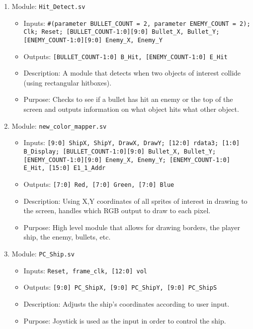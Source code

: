 \begin{enumerate}
    \item Module: \texttt{Hit\_Detect.sv}
    \begin{itemize}
        \item Inputs: \texttt{\#(parameter BULLET\_COUNT = 2, parameter ENEMY\_COUNT = 2); Clk; Reset; [BULLET\_COUNT-1:0][9:0] Bullet\_X, Bullet\_Y; [ENEMY\_COUNT-1:0][9:0] Enemy\_X, Enemy\_Y} 
        \item Outputs: \texttt{[BULLET\_COUNT-1:0] B\_Hit, [ENEMY\_COUNT-1:0] E\_Hit}
        \item Description: A module that detects when two objects of interest collide (using rectangular hitboxes).
        \item Purpose: Checks to see if a bullet has hit an enemy or the top of the screen and outputs information on what object hits what other object.
    \end{itemize}
    
    \item Module: \texttt{new\_color\_mapper.sv}
    \begin{itemize}
        \item Inputs: \texttt{[9:0] ShipX, ShipY, DrawX, DrawY; [12:0] rdata3; [1:0] B\_Display; [BULLET\_COUNT-1:0][9:0] Bullet\_X, Bullet\_Y; [ENEMY\_COUNT-1:0][9:0] Enemy\_X, Enemy\_Y; [ENEMY\_COUNT-1:0] E\_Hit, [15:0] E1\_1\_Addr} 
        \item Outputs: \texttt{[7:0] Red, [7:0] Green, [7:0] Blue}
        \item Description: Using X,Y coordinates of all sprites of interest in drawing to the screen, handles which RGB output to draw to each pixel.
        \item Purpose: High level module that allows for drawing borders, the player ship, the enemy, bullets, etc.
    \end{itemize}
\pagebreak
    \item Module: \texttt{PC\_Ship.sv}
    \begin{itemize}
        \item Inputs: \texttt{Reset, frame\_clk, [12:0] vol} 
        \item Outputs: \texttt{[9:0] PC\_ShipX, [9:0] PC\_ShipY, [9:0] PC\_ShipS}
        \item Description: Adjusts the ship's coordinates according to user input.
        \item Purpose: Joystick is used as the input in order to control the ship.
    \end{itemize}
    

\end{enumerate}
